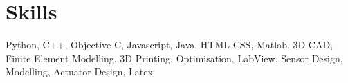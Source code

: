 \section*{Skills}
\hrulefill

Python, C++, Objective C, Javascript, Java, HTML CSS, Matlab, 3D CAD, Finite Element Modelling, 3D Printing, Optimisation, LabView, Sensor Design, Modelling, Actuator Design, Latex
% 
